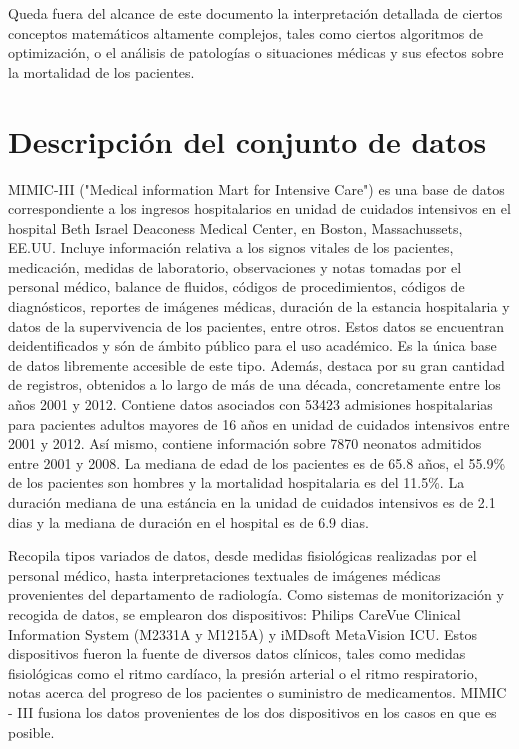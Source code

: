 \documentclass{report}
\begin{document}
Queda fuera del alcance de este documento la interpretación detallada de ciertos conceptos matemáticos altamente complejos, tales como ciertos algoritmos de optimización, o el análisis de patologías o situaciones médicas y sus efectos sobre la mortalidad de los pacientes. 

\chapter{Descripción del conjunto de datos}

MIMIC-III ("Medical information Mart for Intensive Care") es una base de datos correspondiente a los ingresos hospitalarios en unidad de cuidados intensivos en el hospital Beth Israel Deaconess Medical Center, en Boston, Massachussets, EE.UU. Incluye información relativa a los signos vitales de los pacientes, medicación, medidas de laboratorio, observaciones y notas tomadas por el personal médico, balance de fluidos, códigos de procedimientos, códigos de diagnósticos, reportes de imágenes médicas, duración de la estancia hospitalaria y datos de la supervivencia de los pacientes, entre otros. Estos datos se encuentran deidentificados y són de ámbito público para el uso académico. Es la única base de datos libremente accesible de este tipo. Además, destaca por su gran cantidad de registros, obtenidos a lo largo de más de una década, concretamente entre los años 2001 y 2012. Contiene datos asociados con 53423 admisiones hospitalarias para pacientes adultos mayores de 16 años en unidad de cuidados intensivos entre 2001 y 2012. Así mismo, contiene información sobre 7870 neonatos admitidos entre 2001 y 2008. La mediana de edad de los pacientes es de 65.8 años, el 55.9\% de los pacientes son hombres y la mortalidad hospitalaria es del 11.5\%. La duración mediana de una estáncia en la unidad de cuidados intensivos es de 2.1 dias y la mediana de duración en el hospital es de 6.9 dias. 

Recopila tipos variados de datos, desde medidas fisiológicas realizadas por el personal médico, hasta interpretaciones textuales de imágenes médicas provenientes del departamento de radiología. Como sistemas de monitorización y recogida de datos, se emplearon dos dispositivos: Philips CareVue Clinical Information System (M2331A y M1215A) y iMDsoft MetaVision ICU. Estos dispositivos fueron la fuente de diversos datos clínicos, tales como medidas fisiológicas como el ritmo cardíaco, la presión arterial o el ritmo respiratorio, notas acerca del progreso de los pacientes o suministro de medicamentos. MIMIC - III fusiona los datos provenientes de los dos dispositivos en los casos en que es posible. 
\end{document}
